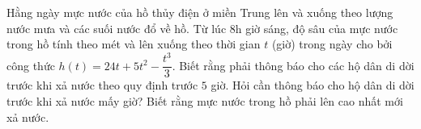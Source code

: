\begin{bt}%
	Hằng ngày mực nước của hồ thủy điện ở miền Trung lên và xuống theo lượng nước mưa và các suối nước đổ về hồ. Từ lúc 8h giờ sáng, độ sâu của mực nước trong hồ tính theo mét và lên xuống theo thời gian $t$ (giờ) trong ngày cho bởi công thức $h\left(t\right)=24t+5t^2-\dfrac{t^3}{3}$. Biết rằng phải thông báo cho các hộ dân di dời trước khi xả nước theo quy định trước $5$ giờ. Hỏi cần thông báo cho hộ dân di dời trước khi xả nước mấy giờ? Biết rằng mực nước trong hồ phải lên cao nhất mới xả nước.
\end{bt}

